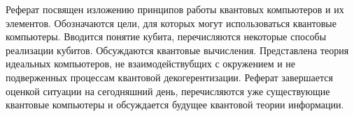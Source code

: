 \begin{center}
\footnotesize{Реферат посвящен изложению принципов работы квантовых компьютеров и их элементов.
Обозначаются цели, для которых могут использоваться квантовые компьютеры.
Вводится понятие кубита, перечисляются некоторые способы реализации кубитов. Обсуждаются квантовые вычисления.
Представлена теория идеальных компьютеров, не взаимодействубщих с окружением и не
подверженных процессам квантовой декогерентизации. Реферат завершается оценкой ситуации
на сегодняшний день, перечисляются уже существующие квантовые компьютеры и обсуждается
будущее квантовой теории информации.}
\end{center}